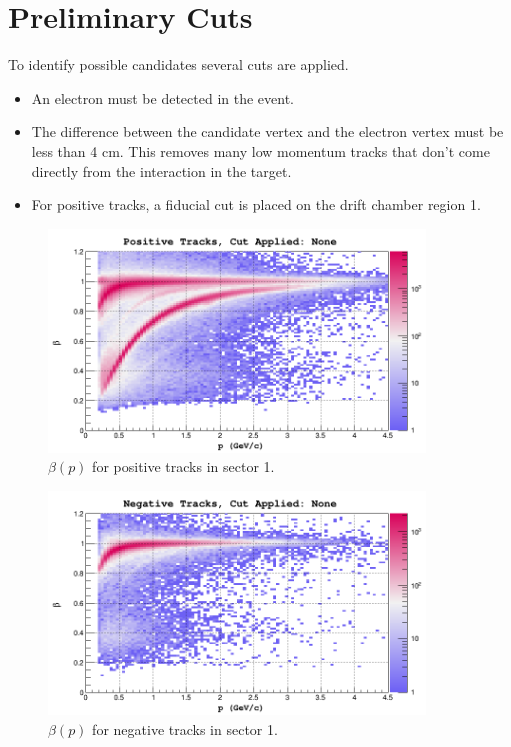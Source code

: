 \section{Preliminary Cuts}

To identify possible candidates several cuts are applied.  

\begin{itemize}
\item{An electron must be detected in the event.}
\item{The difference between the candidate vertex and the electron vertex must be less than 4 cm.  This removes many low momentum tracks that don't come directly from the interaction in the target.}
\item{For positive tracks, a fiducial cut is placed on the drift chamber region 1.}
\end{itemize}

\begin{figure}
  \label{fig:kp_bvp}
  \begin{centering}
    \includegraphics[width=10cm]{image/kp/BetaPNoCutsSector1.png}
    \caption{$\beta (p)$ for positive tracks in sector 1. }
  \end{centering}
\end{figure}

\begin{figure}
  \begin{centering}
    \includegraphics[width=10cm]{image/km/BetaPNoCutsSector1.png}
    \caption{$\beta (p)$ for negative tracks in sector 1. }
  \end{centering}
  \end{figure}

